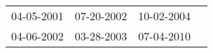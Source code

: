 \begin{supertabular}{llll}
 04-05-2001 &  07-20-2002 &  10-02-2004 \\
 04-06-2002 &  03-28-2003 &  07-04-2010 \\
\end{supertabular}
